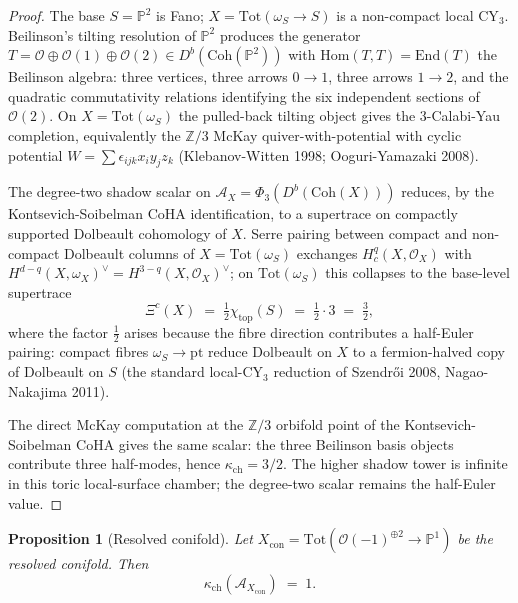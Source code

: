 \documentclass[11pt]{article}
\newtheorem{proposition}[theorem]{Proposition}
\providecommand{\Z}{\mathbb{Z}}
\providecommand{\cA}{\mathcal{A}}
\providecommand{\cO}{\mathcal{O}}
\providecommand{\Coh}{\mathrm{Coh}}
\providecommand{\Tot}{\mathrm{Tot}}
\providecommand{\Hom}{\mathrm{Hom}}
\begin{document}
\begin{proof}
The base $S=\mathbb{P}^2$ is Fano; $X=\Tot(\omega_S\to S)$ is a
non-compact local CY$_3$. Beilinson's tilting resolution of $\mathbb{P}^2$
produces the generator
$T=\cO\oplus\cO(1)\oplus\cO(2)\in D^{b}(\Coh(\mathbb{P}^2))$ with
$\Hom(T,T)=\mathrm{End}(T)$ the Beilinson algebra: three vertices,
three arrows \(0\to 1\), three arrows \(1\to 2\), and the quadratic
commutativity relations identifying the six independent sections of
\(\cO(2)\). On $X=\Tot(\omega_S)$ the pulled-back tilting object gives
the $3$-Calabi-Yau completion, equivalently the $\Z/3$ McKay
quiver-with-potential with cyclic potential
$W=\sum\epsilon_{ijk}x_{i}y_{j}z_{k}$ (Klebanov-Witten 1998;
Ooguri-Yamazaki 2008).

The degree-two shadow scalar on $\cA_X=\Phi_3(D^{b}(\Coh(X)))$ reduces,
by the Kontsevich-Soibelman CoHA identification, to a supertrace on
compactly supported Dolbeault cohomology of $X$. Serre pairing between
compact and non-compact Dolbeault columns of
$X=\Tot(\omega_S)$ exchanges $H^{q}_{c}(X,\cO_X)$ with
$H^{d-q}(X,\omega_X)^{\vee}=H^{3-q}(X,\cO_X)^{\vee}$; on $\Tot(\omega_S)$
this collapses to the base-level supertrace
\[
   \Xi^{c}(X)\;=\;\tfrac{1}{2}\chi_{\mathrm{top}}(S)\;=\;\tfrac{1}{2}\cdot 3\;=\;\tfrac{3}{2},
\]
where the factor $\tfrac12$ arises because the fibre direction
contributes a half-Euler pairing: compact fibres $\omega_S\to\mathrm{pt}$
reduce Dolbeault on $X$ to a fermion-halved copy of Dolbeault on $S$
(the standard local-CY$_3$ reduction of Szendr\H{o}i 2008,
Nagao-Nakajima 2011).

The direct McKay computation at the $\Z/3$ orbifold point of the
Kontsevich-Soibelman CoHA gives the same scalar: the three Beilinson
basis objects contribute three half-modes, hence
\(\kappa_{\mathrm{ch}}=3/2\). The higher shadow tower is infinite in
this toric local-surface chamber; the degree-two scalar remains the
half-Euler value.
\end{proof}

\begin{proposition}[Resolved conifold]
\label{prop:conifold}
Let $X_{\mathrm{con}}=\Tot(\cO(-1)^{\oplus 2}\to\mathbb{P}^1)$ be the
resolved conifold. Then
\[
   \kappa_{\mathrm{ch}}(\cA_{X_{\mathrm{con}}})\;=\;1.
\]
\end{proposition}
\end{document}
